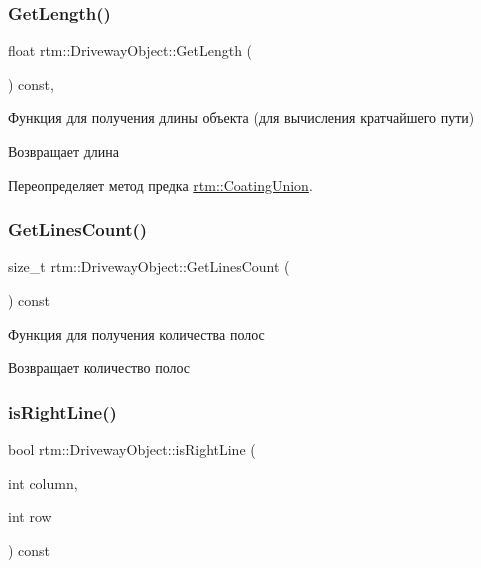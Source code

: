 \subsubsection{\texorpdfstring{Get\+Length()}{GetLength()}}
{\footnotesize\ttfamily float rtm\+::\+Driveway\+Object\+::\+Get\+Length (\begin{DoxyParamCaption}{ }\end{DoxyParamCaption}) const\hspace{0.3cm}{\ttfamily [override]}, {\ttfamily [virtual]}}



Функция для получения длины объекта (для вычисления кратчайшего пути) 

\begin{DoxyReturn}{Возвращает}
длина 
\end{DoxyReturn}


Переопределяет метод предка \hyperlink{classrtm_1_1_coating_union_adf3ec4f4e8399c455aaa73bfe726b4ce}{rtm\+::\+Coating\+Union}.

\mbox{\label{classrtm_1_1_driveway_object_a239d7f4d9d5203d1f00cf60294e94151}} 
\subsubsection{\texorpdfstring{Get\+Lines\+Count()}{GetLinesCount()}}
{\footnotesize\ttfamily size\+\_\+t rtm\+::\+Driveway\+Object\+::\+Get\+Lines\+Count (\begin{DoxyParamCaption}{ }\end{DoxyParamCaption}) const}



Функция для получения количества полос 

\begin{DoxyReturn}{Возвращает}
количество полос 
\end{DoxyReturn}
\mbox{\label{classrtm_1_1_driveway_object_ae427989fc802b24d06f6b7f83959be2a}} 
\subsubsection{\texorpdfstring{is\+Right\+Line()}{isRightLine()}\hspace{0.1cm}{\footnotesize\ttfamily [1/2]}}
{\footnotesize\ttfamily bool rtm\+::\+Driveway\+Object\+::is\+Right\+Line (\begin{DoxyParamCaption}\item[{int}]{column,  }\item[{int}]{row }\end{DoxyParamCaption}) const}



